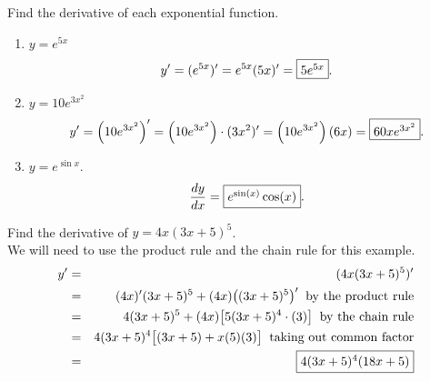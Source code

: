 \documentclass{book}
\begin{document}
\begin{Exam} Find the derivative of each exponential function.\\
\begin{enumerate}
\item $y = e^{5x}$
\[y' = (e^{5x})' = e^{5x}(5x)' = \fbox{$5e^{5x}$}.\]

\item $y = 10e^{3x^2}$
\[y' = \left(10e^{3x^2}\right)' = \left(10e^{3x^2}\right)\cdot (3x^2)' = \left(10e^{3x^2}\right)(6x) = \fbox{$60xe^{3x^2}$}.\]

\item $y = e^{\sin x}$.
\[\dfrac{dy}{dx} = \fbox{$e^{\sin(x)}\cos(x)$}. \]
\end{enumerate}
\end{Exam}\vs

\begin{Exam} Find the derivative of $y = 4x(3x+5)^5$.\\ 

We will need to use the product rule and the chain rule for this example.
\begin{eqnarray*}
y' &=& (4x(3x+5)^5)'\\
&=& (4x)'(3x+5)^5 + (4x)\big((3x+5)^5\big)'\;\;\mbox{by the product rule}\\
&=& 4(3x+5)^5 + (4x)\big[5(3x+5)^4\cdot (3)\big]\;\;\mbox{by the chain rule}\\
&=& 4(3x+5)^4\big[ (3x+5) + x(5)(3)\big]\;\; \mbox{taking out common factor}\\
&=& \fbox{$4(3x+5)^4(18x + 5) $}
\end{eqnarray*}
\end{Exam}\vs

%
%
\end{document}
